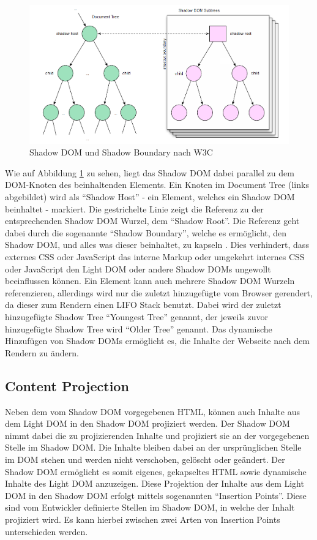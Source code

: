\begin{figure}[htbp]
 \centering
 \includegraphics[width=\linewidth]{kapitel2/bilder/3-shadow-dom-shadow-boundary}
 \caption{Shadow DOM und Shadow Boundary nach W3C}
 \label{fig:sdsbnw3c}
\end{figure}

Wie auf Abbildung \ref{fig:sdsbnw3c} zu sehen, liegt das Shadow DOM dabei parallel zu dem DOM-Knoten des beinhaltenden Elements. Ein Knoten im Document Tree (links abgebildet) wird als ``Shadow Host'' - ein Element, welches ein Shadow DOM beinhaltet - markiert. Die gestrichelte Linie zeigt die Referenz zu der entsprechenden Shadow DOM Wurzel, dem ``Shadow Root''. Die Referenz geht dabei durch die sogenannte ``Shadow Boundary'', welche es ermöglicht, den Shadow DOM, und alles was dieser beinhaltet, zu kapseln \cite{citeulike:13851350}. Dies verhindert, dass externes CSS oder JavaScript das interne Markup oder umgekehrt internes CSS oder JavaScript den Light DOM oder andere Shadow DOMs ungewollt beeinflussen können. Ein Element kann auch mehrere Shadow DOM Wurzeln referenzieren, allerdings wird nur die zuletzt hinzugefügte vom Browser gerendert, da dieser zum Rendern einen LIFO Stack benutzt. Dabei wird der zuletzt hinzugefügte Shadow Tree ``Youngest Tree'' genannt, der jeweils zuvor hinzugefügte Shadow Tree wird ``Older Tree'' genannt. Das dynamische Hinzufügen von Shadow DOMs ermöglicht es, die Inhalte der Webseite nach dem Rendern zu ändern.


\subsection{Content Projection}\label{content-projection}

Neben dem vom Shadow DOM vorgegebenen HTML, können auch Inhalte aus dem Light DOM in den Shadow DOM projiziert werden. Der Shadow DOM nimmt dabei die zu projizierenden Inhalte und projiziert sie an der vorgegebenen Stelle im Shadow DOM. Die Inhalte bleiben dabei an der ursprünglichen Stelle im DOM stehen und werden nicht verschoben, gelöscht oder geändert. Der Shadow DOM ermöglicht es somit eigenes, gekapseltes HTML sowie dynamische Inhalte des Light DOM anzuzeigen. Diese Projektion der Inhalte aus dem Light DOM in den Shadow DOM erfolgt mittels sogenannten ``Insertion Points''. Diese sind vom Entwickler definierte Stellen im Shadow DOM, in welche der Inhalt projiziert wird. Es kann hierbei zwischen zwei Arten von Insertion Points unterschieden werden.

